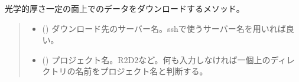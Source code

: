 \documentclass[letterpaper,10pt,dvipdfmx,report]{sphinxmanual}
\begin{document}
\begin{fulllineitems}
\label{\detokenize{io:R2D2.R2D2_data.sync_tau}}
\pysigstartsignatures
{}
\pysigstopsignatures
\sphinxAtStartPar
光学的厚さ一定の面上でのデータをダウンロードするメソッド。
\begin{quote}\begin{description}
\begin{itemize}
\item {} 
\sphinxAtStartPar
{} () \sphinxhyphen{}\sphinxhyphen{} ダウンロード先のサーバー名。sshで使うサーバー名を用いれば良い。

\item {} 
\sphinxAtStartPar
{} () \sphinxhyphen{}\sphinxhyphen{} プロジェクト名。\textquotesingle{}R2D2\textquotesingle{}など。何も入力しなければ一個上のディレクトリの名前をプロジェクト名と判断する。

\end{itemize}

\end{description}\end{quote}

\end{fulllineitems}

\end{document}
